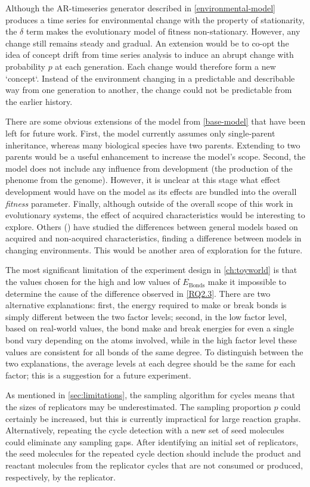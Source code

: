 Although the AR-timeseries generator described in \cref{environmental-model} produces a time series for environmental change with the property of stationarity, the $\delta$ term makes the evolutionary model of fitness non-stationary. However, any change still remains steady and gradual. An extension would be to co-opt the idea of concept drift from time series analysis to induce an abrupt change with probability $p$ at each generation. Each change would therefore form a new `concept`. Instead of the environment changing in a predictable and describable way from one generation to another, the change could not be predictable from the earlier history.

There are some obvious extensions of the model from \cref{base-model} that have been left for future work. First, the model currently assumes only single-parent inheritance, whereas many biological species have two parents. Extending to two parents would be a useful enhancement to increase the model's scope. Second, the model does not include any influence from development (the production of the phenome from the genome). However, it is unclear at this stage what effect development would have on the model as its effects are bundled into the overall \emph{fitness} parameter. Finally, although outside of the overall scope of this work in evolutionary systems, the effect of acquired characteristics would be interesting to explore. Others (\eg \textcite{Gaucherel2012,Paenke:2007ie,Sasaki:2000dq}) have studied the differences between general models based on acquired and non-acquired characteristics, finding a difference between models in changing environments. This would be another area of exploration for the future.

The most significant limitation of the experiment design in \cref{ch:toyworld} is that the values chosen for the high and low values of $E_\mathrm{Bonds}$ make it impossible to determine the cause of the difference observed in \cref{RQ2.3}. There are two alternative explanations: first, the energy required to make or break bonds is simply different between the two factor levels; second, in the low factor level, based on real-world values, the bond make and break energies for even a single bond vary depending on the atoms involved, while in the high factor level these values are consistent for all bonds of the same degree. To distinguish between the two explanations, the average levels at each degree should be the same for each factor; this is a suggestion for a future experiment.

As mentioned in \cref{sec:limitations}, the sampling algorithm for cycles means that the sizes of replicators may be underestimated. The sampling proportion $p$ could certainly be increased, but this is currently impractical for large reaction graphs. Alternatively, repeating the cycle detection with a new set of seed molecules could eliminate any sampling gaps. After identifying an initial set of replicators, the seed molecules for the repeated cycle dection should include the product and reactant molecules from the replicator cycles that are not consumed or produced, respectively, by the replicator.

